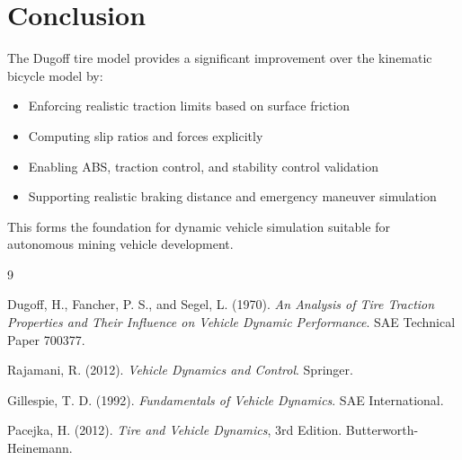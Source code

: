 \documentclass[11pt,a4paper]{article}
\begin{document}
\section{Conclusion}

The Dugoff tire model provides a significant improvement over the kinematic bicycle model by:
\begin{itemize}
    \item Enforcing realistic traction limits based on surface friction
    \item Computing slip ratios and forces explicitly
    \item Enabling ABS, traction control, and stability control validation
    \item Supporting realistic braking distance and emergency maneuver simulation
\end{itemize}

This forms the foundation for dynamic vehicle simulation suitable for autonomous mining vehicle development.

\begin{thebibliography}{9}

Dugoff, H., Fancher, P. S., and Segel, L. (1970).
\textit{An Analysis of Tire Traction Properties and Their Influence on Vehicle Dynamic Performance}.
SAE Technical Paper 700377.

Rajamani, R. (2012). \textit{Vehicle Dynamics and Control}. Springer.

Gillespie, T. D. (1992). \textit{Fundamentals of Vehicle Dynamics}. SAE International.

Pacejka, H. (2012). \textit{Tire and Vehicle Dynamics}, 3rd Edition. Butterworth-Heinemann.

\end{thebibliography}
\end{document}
